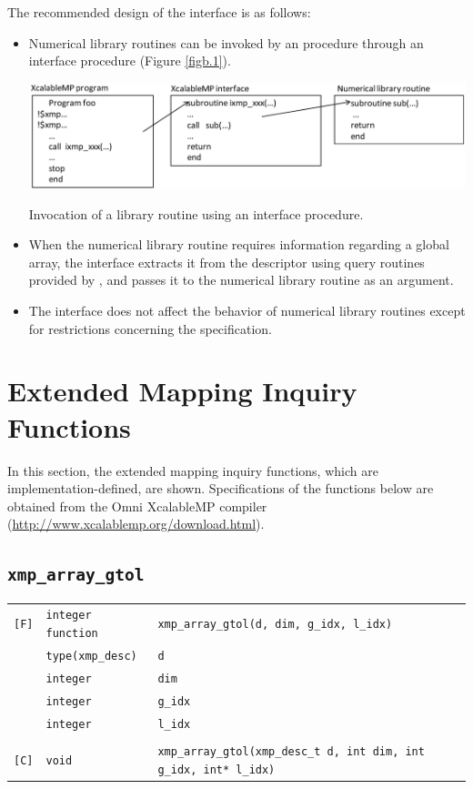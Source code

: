 The recommended design of the interface is as follows:

\begin{itemize}

 \item Numerical library routines can be invoked by an {\XMP} procedure
       through an interface procedure (Figure \ref{figb.1}).

 \begin{myfigure}
  \includegraphics[scale=0.45]{figs/figb.1.eps}
  \caption{Invocation of a library routine using an interface procedure.}
  \label{figb.1}
 \end{myfigure}

 \item When the numerical library routine requires information regarding
       a global array, the interface extracts it from the descriptor
       using query routines provided by {\XMP}, and passes it to the
       numerical library routine as an argument.
%
 \item The interface does not affect the behavior of numerical library
       routines except for restrictions concerning the {\XMP}
       specification.
\end{itemize}


\section{Extended Mapping Inquiry Functions}

In this section, the extended mapping inquiry functions, which are
implementation-defined, are shown.
Specifications of the functions below are obtained from the Omni XcalableMP
compiler (\url{http://www.xcalablemp.org/download.html}).

\subsection{\tt xmp\_array\_gtol} \label{subsec:xmparraygtol}

\begin{tabular}{lll}

\verb![F]!& {\tt integer function} & {\tt xmp\_array\_gtol(d, dim, g\_idx, l\_idx)} \\
          & {\tt type(xmp\_desc)} & {\tt d}\\
          & {\tt integer} & {\tt dim}\\
          & {\tt integer} & {\tt g\_idx}\\
          & {\tt integer} & {\tt l\_idx}\\
          & & \\
\verb![C]!&  {\tt void} & {\tt xmp\_array\_gtol(xmp\_desc\_t d, int dim, int g\_idx, int* l\_idx)}

\end{tabular}


